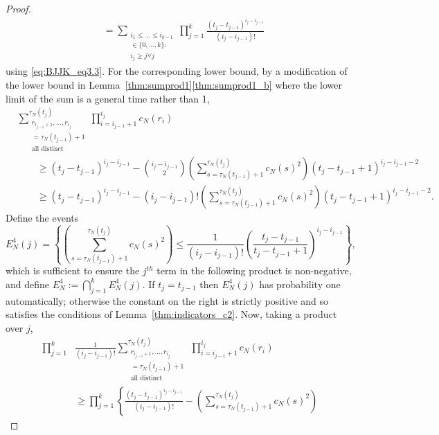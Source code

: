 \begin{proof}
\begin{align*}
&= \sum_{\substack{i_1\leq \dots\leq i_{k-1}\\ \in \{0,\dots,k\} :\\ 
        i_j \geq j \forall j}} \prod_{j=1}^k \frac{(t_j - t_{j-1})^{i_j - i_{j-1}}}
        {(i_j - i_{j-1})!}
\end{align*}
using \eqref{eq:BJJK_eq3.3}.
For the corresponding lower bound, by a modification of the lower bound in Lemma~\ref{thm:sumprod1}\ref{thm:sumprod1_b} where the lower limit of the sum is a general time rather than 1,
\begin{align*}
&\sum_{\substack{ r_{i_{j-1}+1}, \ldots, r_{i_j} \\ = \tau_N(t_{j-1})+1 
        \\ \text{all distinct} }}^{\tau_N(t_j)}  
        \prod_{i=i_{j-1}+1}^{i_j} c_N(r_i) \\
&\qquad\geq (t_j - t_{j-1})^{i_j - i_{j-1}}
        - \binom{i_j - i_{j-1}}{2} \left( \sum_{s=\tau_N(t_{j-1})+1}^{\tau_N(t_j)}        
        c_N(s)^2 \right) ( t_j - t_{j-1} +1 )^{i_j - i_{j-1} -2} \\
&\qquad\geq (t_j - t_{j-1})^{i_j - i_{j-1}}
        - (i_j - i_{j-1})! \left( \sum_{s=\tau_N(t_{j-1})+1}^{\tau_N(t_j)}
        c_N(s)^2 \right) ( t_j - t_{j-1} +1 )^{i_j - i_{j-1} -2} .
\end{align*}
Define the events
\begin{equation*}
E_N^4(j)
= \left\{ \left( \sum_{s=\tau_N(t_{j-1})+1}^{\tau_N(t_j)} c_N(s)^2 \right)
        \leq \frac{1}{(i_j - i_{j-1}) !}  \left( \frac{ t_j - t_{j-1} }{ t_j - t_{j-1} +1 }
        \right)^{i_j - i_{j-1}} \right\} ,
\end{equation*}
which is sufficient to ensure the $j^{th}$ term in the following product is non-negative,
and define 
$E_N^4 := \bigcap_{j=1}^k E_N^4(j)$.
If $t_j = t_{j-1}$ then $E_N^4(j)$ has probability one automatically; otherwise the constant on the right is strictly positive and so satisfies the conditions of Lemma~\ref{thm:indicators_c2}.
Now, taking a product over $j$, 
\begin{align*}
\prod_{j=1}^k &\frac{1}{(i_j - i_{j-1})!}
        \sum_{\substack{ r_{i_{j-1}+1}, \ldots, r_{i_j} \\ = \tau_N(t_{j-1})+1 
        \\ \text{all distinct} }}^{\tau_N(t_j)} 
        \,\prod_{i=i_{j-1}+1}^{i_j} c_N(r_i) \\
&\geq \prod_{j=1}^k \left\{ \frac{(t_j - t_{j-1})^{i_j - i_{j-1}}}{(i_j - i_{j-1})!}  
        - \left( \sum_{s=\tau_N(t_{j-1})+1}^{\tau_N(t_j)} c_N(s)^2 \right)

\end{align*}
\end{proof}
